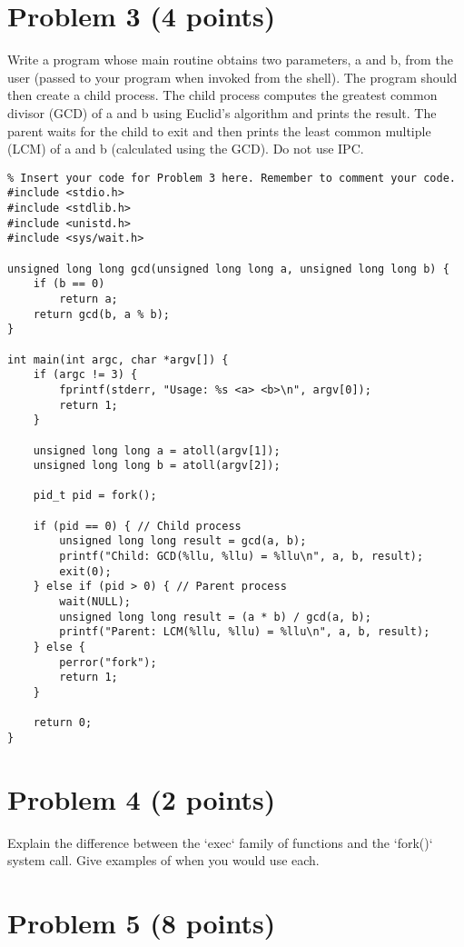 \documentclass{article}
\begin{document}
\section*{Problem 3 (4 points)}

Write a program whose main routine obtains two parameters, a and b, from the user (passed to your program when invoked from the shell). The program should then create a child process. The child process computes the greatest common divisor (GCD) of a and b using Euclid's algorithm and prints the result. The parent waits for the child to exit and then prints the least common multiple (LCM) of a and b (calculated using the GCD).  Do not use IPC.

\begin{verbatim}
% Insert your code for Problem 3 here. Remember to comment your code.
#include <stdio.h>
#include <stdlib.h>
#include <unistd.h>
#include <sys/wait.h>

unsigned long long gcd(unsigned long long a, unsigned long long b) {
    if (b == 0)
        return a;
    return gcd(b, a % b);
}

int main(int argc, char *argv[]) {
    if (argc != 3) {
        fprintf(stderr, "Usage: %s <a> <b>\n", argv[0]);
        return 1;
    }

    unsigned long long a = atoll(argv[1]);
    unsigned long long b = atoll(argv[2]);

    pid_t pid = fork();

    if (pid == 0) { // Child process
        unsigned long long result = gcd(a, b);
        printf("Child: GCD(%llu, %llu) = %llu\n", a, b, result);
        exit(0);
    } else if (pid > 0) { // Parent process
        wait(NULL);
        unsigned long long result = (a * b) / gcd(a, b);
        printf("Parent: LCM(%llu, %llu) = %llu\n", a, b, result);
    } else {
        perror("fork");
        return 1;
    }

    return 0;
}
\end{verbatim}


\section*{Problem 4 (2 points)}

Explain the difference between the `exec` family of functions and the `fork()` system call.  Give examples of when you would use each.

\section*{Problem 5 (8 points)}
\end{document}
